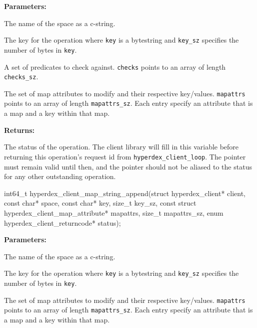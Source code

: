 \noindent\textbf{Parameters:}
\begin{description}[labelindent=\widthof{{\texttt{mapattrs}, \texttt{mapattrs\_sz}}},leftmargin=*,noitemsep,nolistsep,align=right]
\item[\texttt{space}] The name of the space as a c-string.
\item[\texttt{key}, \texttt{key\_sz}] The key for the operation where \texttt{key} is a bytestring and \texttt{key\_sz} specifies the number of bytes in \texttt{key}.
\item[\texttt{checks}, \texttt{checks\_sz}] A set of predicates to check against.  \texttt{checks} points to an array of length \texttt{checks\_sz}.
\item[\texttt{mapattrs}, \texttt{mapattrs\_sz}] The set of map attributes to modify and their respective key/values.  \texttt{mapattrs} points to an array of length \texttt{mapattrs\_sz}.  Each entry specify an attribute that is a map and a key within that map.
\end{description}

\noindent\textbf{Returns:}
\begin{description}[labelindent=\widthof{{\texttt{status}}},leftmargin=*,noitemsep,nolistsep,align=right]
\item[\texttt{status}] The status of the operation.  The client library will fill in this variable before returning this operation's request id from \texttt{hyperdex\_client\_loop}.  The pointer must remain valid until then, and the pointer should not be aliased to the status for any other outstanding operation.
\end{description}

\funcsep
{}
\begin{ccode}
int64_t hyperdex_client_map_string_append(struct hyperdex_client* client,
                const char* space,
                const char* key, size_t key_sz,
                const struct hyperdex_client_map_attribute* mapattrs, size_t mapattrs_sz,
                enum hyperdex_client_returncode* status);
\end{ccode}
\funcdesc 

\noindent\textbf{Parameters:}
\begin{description}[labelindent=\widthof{{\texttt{mapattrs}, \texttt{mapattrs\_sz}}},leftmargin=*,noitemsep,nolistsep,align=right]
\item[\texttt{space}] The name of the space as a c-string.
\item[\texttt{key}, \texttt{key\_sz}] The key for the operation where \texttt{key} is a bytestring and \texttt{key\_sz} specifies the number of bytes in \texttt{key}.
\item[\texttt{mapattrs}, \texttt{mapattrs\_sz}] The set of map attributes to modify and their respective key/values.  \texttt{mapattrs} points to an array of length \texttt{mapattrs\_sz}.  Each entry specify an attribute that is a map and a key within that map.
\end{description}

